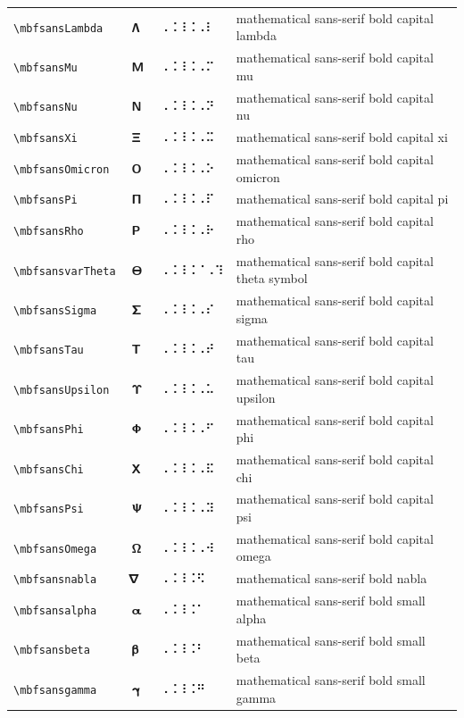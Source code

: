 \documentclass[oneside]{article}
\begin{document}
\begin{longtable}{llll}
\verb|\mbfsansLambda| & $\mbfsansLambda$ &  ⠠⠨⠸⠨⠠⠇  & {mathematical sans-serif bold capital lambda} \\[2ex]
\verb|\mbfsansMu| & $\mbfsansMu$ &  ⠠⠨⠸⠨⠠⠍  & {mathematical sans-serif bold capital mu} \\[2ex]
\verb|\mbfsansNu| & $\mbfsansNu$ &  ⠠⠨⠸⠨⠠⠝  & {mathematical sans-serif bold capital nu} \\[2ex]
\verb|\mbfsansXi| & $\mbfsansXi$ &  ⠠⠨⠸⠨⠠⠭  & {mathematical sans-serif bold capital xi} \\[2ex]
\verb|\mbfsansOmicron| & $\mbfsansOmicron$ &  ⠠⠨⠸⠨⠠⠕  & {mathematical sans-serif bold capital omicron} \\[2ex]
\verb|\mbfsansPi| & $\mbfsansPi$ &  ⠠⠨⠸⠨⠠⠏  & {mathematical sans-serif bold capital pi} \\[2ex]
\verb|\mbfsansRho| & $\mbfsansRho$ &  ⠠⠨⠸⠨⠠⠗  & {mathematical sans-serif bold capital rho} \\[2ex]
\verb|\mbfsansvarTheta| & $\mbfsansvarTheta$ &  ⠠⠨⠸⠨⠈⠠⠹  & {mathematical sans-serif bold capital theta symbol} \\[2ex]
\verb|\mbfsansSigma| & $\mbfsansSigma$ &  ⠠⠨⠸⠨⠠⠎  & {mathematical sans-serif bold capital sigma} \\[2ex]
\verb|\mbfsansTau| & $\mbfsansTau$ &  ⠠⠨⠸⠨⠠⠞  & {mathematical sans-serif bold capital tau} \\[2ex]
\verb|\mbfsansUpsilon| & $\mbfsansUpsilon$ &  ⠠⠨⠸⠨⠠⠥  & {mathematical sans-serif bold capital upsilon} \\[2ex]
\verb|\mbfsansPhi| & $\mbfsansPhi$ &  ⠠⠨⠸⠨⠠⠋  & {mathematical sans-serif bold capital phi} \\[2ex]
\verb|\mbfsansChi| & $\mbfsansChi$ &  ⠠⠨⠸⠨⠠⠯  & {mathematical sans-serif bold capital chi} \\[2ex]
\verb|\mbfsansPsi| & $\mbfsansPsi$ &  ⠠⠨⠸⠨⠠⠽  & {mathematical sans-serif bold capital psi} \\[2ex]
\verb|\mbfsansOmega| & $\mbfsansOmega$ &  ⠠⠨⠸⠨⠠⠺  & {mathematical sans-serif bold capital omega} \\[2ex]
\verb|\mbfsansnabla| & $\mbfsansnabla$ &  ⠠⠨⠸⠨⠫  & {mathematical sans-serif bold nabla} \\[2ex]
\verb|\mbfsansalpha| & $\mbfsansalpha$ &  ⠠⠨⠸⠨⠁  & {mathematical sans-serif bold small alpha} \\[2ex]
\verb|\mbfsansbeta| & $\mbfsansbeta$ &  ⠠⠨⠸⠨⠃  & {mathematical sans-serif bold small beta} \\[2ex]
\verb|\mbfsansgamma| & $\mbfsansgamma$ &  ⠠⠨⠸⠨⠛  & {mathematical sans-serif bold small gamma} \\[2ex]

\end{longtable}
\end{document}
